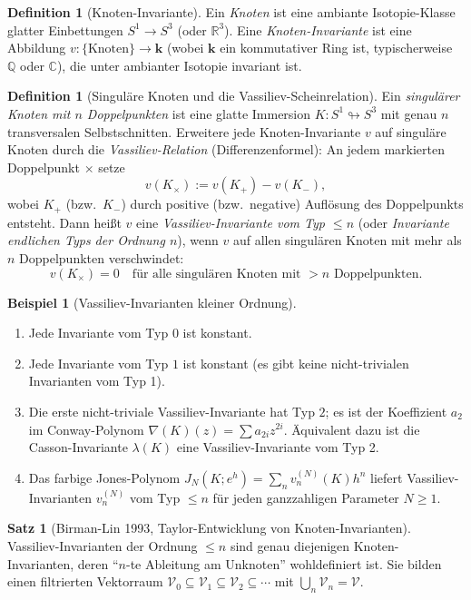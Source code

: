 \documentclass[12pt,a4paper]{amsart}
\theoremstyle{definition}
\newtheorem{example}[theorem]{Beispiel}
\newtheorem{satz}[theorem]{Satz}
\newtheorem{definition_de}[theorem]{Definition}
\newcommand{\Q}{\mathbb{Q}}
\newcommand{\R}{\mathbb{R}}
\newcommand{\C}{\mathbb{C}}
\begin{document}
\begin{definition_de}[Knoten-Invariante]
Ein \emph{Knoten} ist eine ambiante Isotopie-Klasse glatter Einbettungen
$S^1 \to S^3$ (oder $\R^3$).  Eine \emph{Knoten-Invariante} ist eine
Abbildung $v: \{\text{Knoten}\} \to \mathbf{k}$ (wobei $\mathbf{k}$ ein
kommutativer Ring ist, typischerweise $\Q$ oder $\C$), die unter ambianter
Isotopie invariant ist.
\end{definition_de}

\begin{definition_de}[Singuläre Knoten und die Vassiliev-Scheinrelation]
\label{def:vassiliev}
Ein \emph{singulärer Knoten mit $n$ Doppelpunkten} ist eine glatte Immersion
$K: S^1 \looparrowright S^3$ mit genau $n$ transversalen Selbstschnitten.
Erweitere jede Knoten-Invariante $v$ auf singuläre Knoten durch die
\emph{Vassiliev-Relation} (Differenzenformel): An jedem markierten
Doppelpunkt $\times$ setze
\[
  v(K_\times) := v(K_+) - v(K_-),
\]
wobei $K_+$ (bzw.\ $K_-$) durch positive (bzw.\ negative) Auflösung des
Doppelpunkts entsteht.  Dann heißt $v$ eine \emph{Vassiliev-Invariante
vom Typ $\leq n$} (oder \emph{Invariante endlichen Typs der Ordnung $n$}),
wenn $v$ auf allen singulären Knoten mit mehr als $n$ Doppelpunkten
verschwindet:
\[
  v(K_\times) = 0 \quad \text{für alle singulären Knoten mit } > n \text{ Doppelpunkten.}
\]
\end{definition_de}

\begin{example}[Vassiliev-Invarianten kleiner Ordnung]
\begin{enumerate}[label=(\alph*)]
  \item Jede Invariante vom Typ $0$ ist konstant.
  \item Jede Invariante vom Typ $1$ ist konstant (es gibt keine nicht-trivialen
        Invarianten vom Typ 1).
  \item Die erste nicht-triviale Vassiliev-Invariante hat Typ $2$; es ist der
        Koeffizient $a_2$ im Conway-Polynom $\nabla(K)(z) = \sum a_{2i} z^{2i}$.
        Äquivalent dazu ist die Casson-Invariante $\lambda(K)$ eine
        Vassiliev-Invariante vom Typ 2.
  \item Das farbige Jones-Polynom $J_N(K;e^h) = \sum_n v_n^{(N)}(K) h^n$
        liefert Vassiliev-Invarianten $v_n^{(N)}$ vom Typ $\leq n$ für jeden
        ganzzahligen Parameter $N \geq 1$.
\end{enumerate}
\end{example}

\begin{satz}[Birman-Lin 1993, Taylor-Entwicklung von Knoten-Invarianten]
\label{satz:birmanlin}
Vassiliev-Invarianten der Ordnung $\leq n$ sind genau diejenigen
Knoten-Invarianten, deren ``$n$-te Ableitung am Unknoten'' wohldefiniert
ist.  Sie bilden einen filtrierten Vektorraum
$\mathcal{V}_0 \subseteq \mathcal{V}_1 \subseteq \mathcal{V}_2 \subseteq \cdots$
mit $\bigcup_n \mathcal{V}_n = \mathcal{V}$.
\end{satz}
\end{document}
